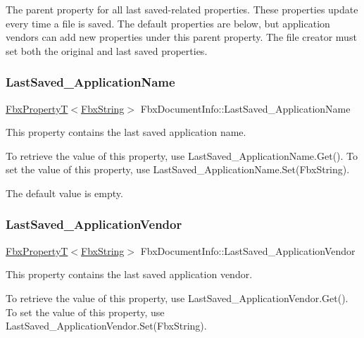 The parent property for all last saved-\/related properties. These properties update every time a file is saved. The default properties are below, but application vendors can add new properties under this parent property. The file creator must set both the original and last saved properties. \mbox{\label{class_fbx_document_info_a336bfd3129c31d0739e87e19a344035b}} 
\subsubsection{\texorpdfstring{Last\+Saved\+\_\+\+Application\+Name}{LastSaved\_ApplicationName}}
{\footnotesize\ttfamily \hyperlink{class_fbx_property_t}{Fbx\+PropertyT}$<$\hyperlink{class_fbx_string}{Fbx\+String}$>$ Fbx\+Document\+Info\+::\+Last\+Saved\+\_\+\+Application\+Name}

This property contains the last saved application name.

To retrieve the value of this property, use Last\+Saved\+\_\+\+Application\+Name.\+Get(). To set the value of this property, use Last\+Saved\+\_\+\+Application\+Name.\+Set(\+Fbx\+String).

The default value is empty. \mbox{\label{class_fbx_document_info_a051cf70eb77b5b8278ebb9a88af20bef}} 
\subsubsection{\texorpdfstring{Last\+Saved\+\_\+\+Application\+Vendor}{LastSaved\_ApplicationVendor}}
{\footnotesize\ttfamily \hyperlink{class_fbx_property_t}{Fbx\+PropertyT}$<$\hyperlink{class_fbx_string}{Fbx\+String}$>$ Fbx\+Document\+Info\+::\+Last\+Saved\+\_\+\+Application\+Vendor}

This property contains the last saved application vendor.

To retrieve the value of this property, use Last\+Saved\+\_\+\+Application\+Vendor.\+Get(). To set the value of this property, use Last\+Saved\+\_\+\+Application\+Vendor.\+Set(\+Fbx\+String).

